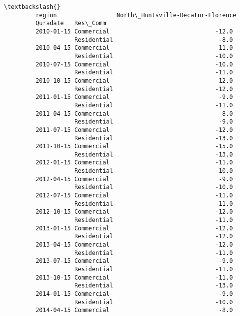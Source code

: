 \documentclass[11pt]{article}
\begin{document}
\begin{Verbatim}[commandchars=\\\{\}]
                                                                   \textbackslash{}
         region                 North\_Huntsville-Decatur-Florence   
         Quradate   Res\_Comm                                        
         2010-01-15 Commercial                              -12.0   
                    Residential                              -8.0   
         2010-04-15 Commercial                              -11.0   
                    Residential                             -10.0   
         2010-07-15 Commercial                              -10.0   
                    Residential                             -11.0   
         2010-10-15 Commercial                              -12.0   
                    Residential                             -12.0   
         2011-01-15 Commercial                               -9.0   
                    Residential                             -11.0   
         2011-04-15 Commercial                               -8.0   
                    Residential                              -9.0   
         2011-07-15 Commercial                              -12.0   
                    Residential                             -13.0   
         2011-10-15 Commercial                              -15.0   
                    Residential                             -13.0   
         2012-01-15 Commercial                              -11.0   
                    Residential                             -10.0   
         2012-04-15 Commercial                               -9.0   
                    Residential                             -10.0   
         2012-07-15 Commercial                              -11.0   
                    Residential                             -11.0   
         2012-10-15 Commercial                              -12.0   
                    Residential                             -11.0   
         2013-01-15 Commercial                              -12.0   
                    Residential                             -12.0   
         2013-04-15 Commercial                              -12.0   
                    Residential                             -11.0   
         2013-07-15 Commercial                               -9.0   
                    Residential                             -11.0   
         2013-10-15 Commercial                              -11.0   
                    Residential                             -13.0   
         2014-01-15 Commercial                               -9.0   
                    Residential                             -10.0   
         2014-04-15 Commercial                               -8.0   

\end{Verbatim}
\end{document}
